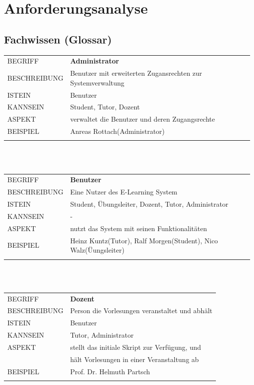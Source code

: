 \documentclass[12pt,a4paper]{article}
\begin{document}
\section{Anforderungsanalyse}
\subsection{Fachwissen (Glossar)}
\begin{tabular}{l p{12cm}}  
BEGRIFF 	 & \textbf{Administrator} \\ 
BESCHREIBUNG & Benutzer mit erweiterten Zugansrechten zur Systemverwaltung\\ 
ISTEIN   	 & Benutzer \\
KANNSEIN 	 & Student, Tutor, Dozent \\ 
ASPEKT   	 & verwaltet die Benutzer und deren Zugangsrechte\\
BEISPIEL 	 & Anreas Rottach(Administrator)\\\\
\hline
\end{tabular}\\\\  

\begin{tabular}{l p{12cm}}
BEGRIFF 	 & \textbf{Benutzer} \\ 
BESCHREIBUNG & Eine Nutzer des E-Learning System \\ 
ISTEIN   	 & Student, Übungsleiter, Dozent, Tutor, Administrator \\
KANNSEIN 	 &   - \\ 
ASPEKT   	 & nutzt das System mit seinen Funktionalitäten\\
BEISPIEL 	 & Heinz Kuntz(Tutor), Ralf Morgen(Student), Nico Walz(Üungsleiter)\\\\
\hline
\end{tabular}\\\\    

\begin{tabular}{l p{12cm}}
BEGRIFF 	 & \textbf{Dozent} \\ 
BESCHREIBUNG & Person die Vorlesungen veranstaltet und abhält \\ 
ISTEIN   	 & Benutzer\\
KANNSEIN 	 & Tutor, Administrator \\ 
ASPEKT   	 & stellt das initiale Skript zur Verfügung, und\\
			 &  hält Vorlesungen in einer Veranstaltung ab\\
BEISPIEL 	 & Prof. Dr. Helmuth Partsch\\\\
\hline
\end{tabular}\\\\   
\end{document}
